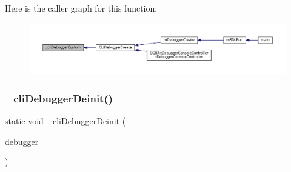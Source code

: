 Here is the caller graph for this function\+:
\nopagebreak
\begin{figure}[H]
\begin{center}
\leavevmode
\includegraphics[width=350pt]{debugger_2cli-debugger_8c_a510220aead524d147cc3f8877336c028_icgraph}
\end{center}
\end{figure}
\mbox{\label{debugger_2cli-debugger_8c_a3c33653a15d0b7731137bd69b02ce538}} 
\subsubsection{\texorpdfstring{\+\_\+cli\+Debugger\+Deinit()}{\_cliDebuggerDeinit()}}
{\footnotesize\ttfamily static void \+\_\+cli\+Debugger\+Deinit (\begin{DoxyParamCaption}\item[{struct m\+Debugger $\ast$}]{debugger }\end{DoxyParamCaption})\hspace{0.3cm}{\ttfamily [static]}}

